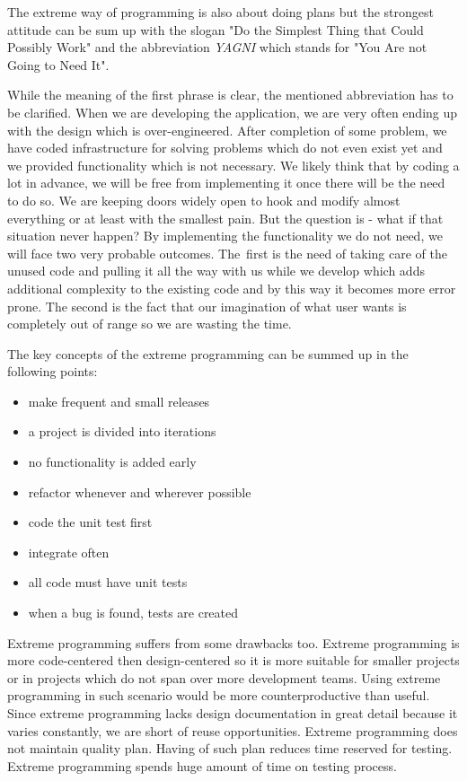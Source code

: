 \documentclass[12pt,final,oneside]{fithesis}
\begin{document}
The extreme way of programming is also about doing plans but the strongest attitude can be sum up with the slogan "Do the Simplest Thing that Could Possibly Work" and the abbreviation \textit{YAGNI} which stands for "You Are not Going to Need It".

While the meaning of the first phrase is clear, the mentioned abbreviation has to be clarified. When we are developing the application, we are very often ending up with the design which is over-engineered. After completion of some problem, we have coded infrastructure for solving problems which do not even exist yet and we provided functionality which is not necessary. We likely think that by coding a lot in advance, we will be free from implementing it once there will be the need to do so. We are keeping doors widely open to hook and modify almost everything or at least with the smallest pain. But the question is - what if that situation never happen? By implementing the functionality we do not need, we will face two very probable outcomes. The~first is the need of taking care of the unused code and pulling it all the way with us while we develop which adds additional complexity to the existing code and by this way it becomes more error prone. The second is the fact that our imagination of what user wants is completely out of range so we are wasting the time.

The key concepts of the extreme programming can be summed up in the following points:
\begin{itemize}
	\item make frequent and small releases
	\item a project is divided into iterations
	\item no functionality is added early
	\item refactor whenever and wherever possible
	\item code the unit test first
	\item integrate often
	\item all code must have unit tests
	\item when a bug is found, tests are created
\end{itemize}   

Extreme programming suffers from some drawbacks too. Extreme programming is more code-centered then design-centered so it is more suitable for smaller projects or in projects which do not span over more development teams. Using extreme programming in such scenario would be more counterproductive than useful. Since extreme programming lacks design documentation in great detail because it varies constantly, we are short of reuse opportunities. Extreme programming does not maintain quality plan. Having of such plan reduces time reserved for testing. Extreme programming spends huge amount of time on testing process. 
\end{document}
